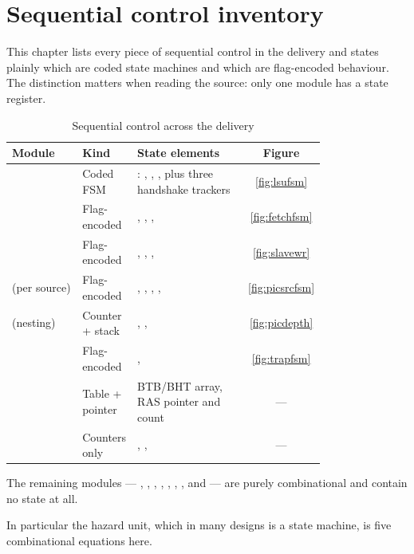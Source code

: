 \chapter{Sequential control inventory}
\label{ch:fsms}

This chapter lists every piece of sequential control in the delivery and states
plainly which are coded state machines and which are flag-encoded behaviour. The
distinction matters when reading the source: only one module has a state
register.

\begin{table}[H]
\centering
\caption{Sequential control across the delivery}
\label{tab:fsminv}
\begin{tabular}{@{}L{0.24\linewidth}L{0.14\linewidth}L{0.40\linewidth}c@{}}
\toprule
\textbf{Module} & \textbf{Kind} & \textbf{State elements} & \textbf{Figure} \\
\midrule
{} & Coded FSM & : , , ,
  plus three handshake trackers & \ref{fig:lsufsm} \\
 & Flag-encoded & , ,
  ,  & \ref{fig:fetchfsm} \\
 & Flag-encoded & , ,
  ,  & \ref{fig:slavewr} \\
 (per source) & Flag-encoded & , ,
  , ,  & \ref{fig:picsrcfsm} \\
 (nesting) & Counter + stack & , ,
   & \ref{fig:picdepth} \\
 & Flag-encoded & ,  & \ref{fig:trapfsm} \\
 & Table + pointer & BTB/BHT array, RAS pointer
   and count  & --- \\
 & Counters only & , ,  & --- \\
\bottomrule
\end{tabular}
\end{table}

\begin{sloppypar}
The remaining modules --- , , ,
, , ,
,  and  ---
are purely combinational and contain no state at all.
\end{sloppypar}
\noindent In particular the hazard unit,
which in many designs is a state machine, is five combinational equations here.

